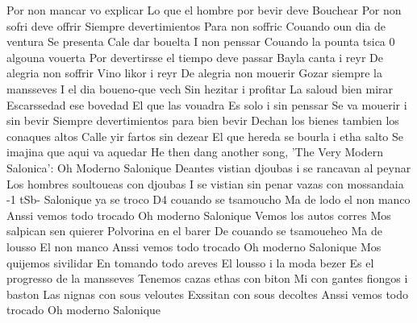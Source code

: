 Por non mancar vo explicar 
Lo que el hombre por bevir deve Bouchear 
Por non sofri 
deve offrir 
Siempre devertimientos 
Para non soffric 
Couando oun dia de ventura 
Se presenta 
Cale dar bouelta 
I non penssar 
Couando la pounta tsica 
0 algouna vouerta 
Por devertirsse el tiempo deve passar 
Bayla canta i reyr 
De alegria non soffrir 
Vino likor i reyr 
De alegria non mouerir 
Gozar siempre la mansseves 
I el dia boueno-que vech 
Sin hezitar i profitar 
La saloud bien mirar 
Escarssedad ese bovedad 
El que las vouadra 
Es solo i sin penssar 
Se va mouerir i sin bevir 
Siempre devertimientos para bien bevir 
Dechan los bienes tambien los conaques altos 
Calle yir fartos sin dezear 
El que hereda se bourla i etha salto 
Se imajina que aqui va aquedar 
He then dang another song, 'The Very Modern Salonica': 
Oh Moderno Salonique 
Deantes vistian djoubas 
i se rancavan al peynar 
Los hombres soultoueas con djoubas 
I se vistian sin penar 
vazas con mossandaia 
-1 tSb-
Salonique ya se troco 
D4 couando se tsamoucho 
Ma de lodo el non manco 
Anssi vemos todo trocado 
Oh moderno Salonique 
Vemos los autos corres 
Mos salpican sen quierer 
Polvorina en el barer 
De couando se tsamoueheo 
Ma de lousso 
El non manco 
Anssi vemos todo trocado 
Oh moderno Salonique 
Mos quijemos sivilidar 
En tomando todo areves 
El lousso i la moda bezer 
Es el progresso de la mansseves 
Tenemos cazas ethas con biton 
Mi con gantes fiongos i baston 
Las nignas con sous veloutes 
Exssitan con sous decoltes 
Anssi vemos todo trocado 
Oh moderno Salonique 

